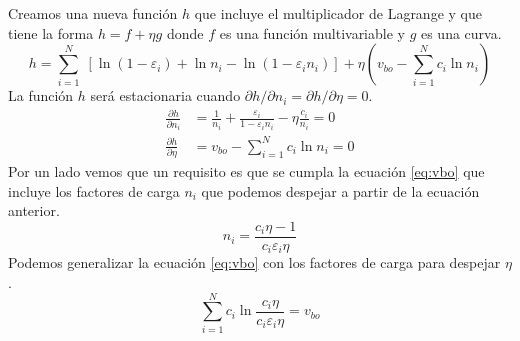 \documentclass{article}
\begin{document}
Creamos una nueva función $h$ que incluye el multiplicador de Lagrange y que tiene la forma $h = f + \eta g$ donde $f$ es una función multivariable y $g$ es una curva.
\begin{equation}
    h = \sum_{i=1}^N \;[\ln(1 - \varepsilon_i) + \ln n_i - \ln (1 - \varepsilon_i n_i)] + \eta \left( v_{bo} - \sum_{i=1}^N c_i \ln n_i \right)
\end{equation}
La función $h$ será estacionaria cuando $\partial h/\partial n_i = \partial h/\partial \eta = 0$.
\begin{equation}
\begin{split}
    \frac{\partial h}{\partial n_i} &= \frac{1}{n_i} + \frac{\varepsilon_i}{1 - \varepsilon_i n_i} - \eta \frac{c_i}{n_i} = 0 \\
    \frac{\partial h}{\partial \eta} &= v_{bo} - \sum_{i = 1}^N c_i \ln n_i = 0
\end{split}
\end{equation}
Por un lado vemos que un requisito es que se cumpla la ecuación \ref{eq:vbo} que incluye los factores de carga $n_i$ que podemos despejar a partir de la ecuación anterior.
\begin{equation} \label{eq:n}
    n_i = \frac{c_i \eta - 1}{c_i \varepsilon_i \eta}
\end{equation}
Podemos generalizar la ecuación \ref{eq:vbo} con los factores de carga para despejar $\eta$.  
\begin{equation}
    \sum_{i=1}^N c_i \ln \frac{c_i \eta}{c_i \varepsilon_i \eta} = v_{bo}
\end{equation}
\end{document}
